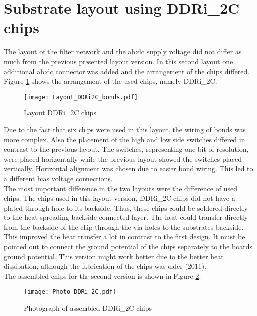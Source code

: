 \newpage
\section{Substrate layout using DDRi\_2C chips}
The layout of the filter network and the \gls{ab:dc} supply voltage did not differ as much from the previous presented layout version.
In this second layout one additional \gls{ab:dc} connector was added and the arrangement of the chips differed.
Figure \ref{fig:layoutDDRi2Cbond} shows the arrangement of the used chips, namely DDRi\_2C.


\begin{figure}[htb!]
	\centering
  \texttt{[image: Layout\_DDRi2C\_bonds.pdf]}
	\caption{Layout DDRi\_2C chips}
	\label{fig:layoutDDRi2Cbond}
\end{figure}

Due to the fact that six chips were used in this layout, the wiring of bonds was more complex.
Also the placement of the high and low side switches differed in contrast to the previous layout.
The switches, representing one bit of resolution, were placed horizontally while the previous layout showed the switches placed vertically.
Horizontal alignment was chosen due to easier bond wiring.
This led to a different bias voltage connections.\\

The most important difference in the two layouts were the difference of used chips.
The chips used in this layout version, DDRi\_2C chips did not have a plated through hole to its backside.
Thus, these chips could be soldered directly to the heat spreading backside connected layer.
The heat could transfer directly from the backside of the chip through the via holes to the substrates backside.
This improved the heat transfer a lot in contrast to the first design.
It must be pointed out to connect the ground potential of the chips separately to the boards ground potential.
This version might work better due to the better heat dissipation, although the fabrication of the chips was older (2011).\\
The assembled chips for the second version is shown in Figure \ref{fig:photoDDRi2Cbond}.

\begin{figure}[htb!]
	\centering
  \texttt{[image: Photo\_DDRi\_2C.pdf]}
	\caption{Photograph of assembled DDRi\_2C chips}
	\label{fig:photoDDRi2Cbond}
\end{figure}


